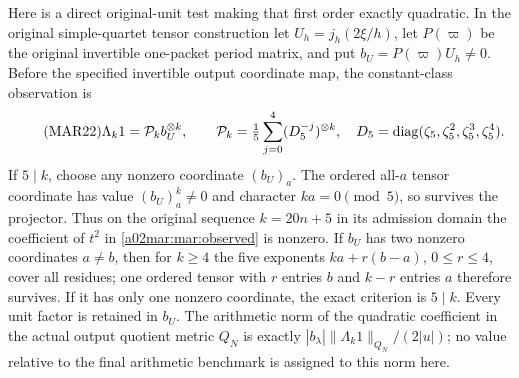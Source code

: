 Here is a direct original-unit test making that first order
exactly quadratic. In the original simple-quartet tensor
construction let $U_h=j_h(2\xi/h)$, let $P(\varpi)$ be the
original invertible one-packet period matrix, and put
$b_U=P(\varpi)U_h\ne0$. Before the specified invertible output
coordinate map, the constant-class observation is
\begin{equation}\tag{MAR22}\label{a02mar:mar:constant-survival}
 \Lambda_k1=\mathcal P_k b_U^{\otimes k},\qquad
 \mathcal P_k=\tfrac15\sum_{j=0}^4(D_5^{-j})^{\otimes k},
 \quad D_5=\operatorname{diag}(\zeta_5,\zeta_5^2,\zeta_5^3,\zeta_5^4).
\end{equation}
If $5\mid k$, choose any nonzero coordinate $(b_U)_a$.
The ordered all-$a$ tensor coordinate has value $(b_U)_a^k\ne0$
and character $ka=0\pmod5$, so survives the projector. Thus on
the original sequence $k=20n+5$ in its admission domain the
coefficient of $t^2$ in \eqref{a02mar:mar:observed} is nonzero.
If $b_U$ has two nonzero coordinates $a\ne b$, then for $k\ge4$
the five exponents $ka+r(b-a)$, $0\le r\le4$, cover all residues;
one ordered tensor with $r$ entries $b$ and $k-r$ entries $a$
therefore survives. If it has only one nonzero coordinate, the
exact criterion is $5\mid k$. Every unit factor is retained in
$b_U$. The arithmetic norm of the quadratic coefficient in the
actual output quotient metric $Q_N$ is exactly
$|b_\lambda|\|\Lambda_k1\|_{Q_N}/(2|u|)$; no value relative to
the final arithmetic benchmark is assigned to this norm here.

